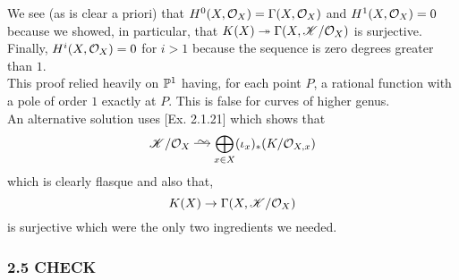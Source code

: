 \documentclass[12pt]{article}
\begin{document}
\begin{center}
\end{center}
We see (as is clear a priori) that $H^0(X, \struct{X}) = \Gamma(X, \struct{X})$ and $H^1(X, \struct{X}) = 0$ because we showed, in particular, that $K(X) \onto \Gamma(X, \K/\struct{X})$ is surjective. Finally, $H^i(X, \struct{X}) = 0$ for $i > 1$ because the sequence is zero degrees greater than $1$.
\bigskip\\
This proof relied heavily on $\P^1$ having, for each point $P$, a rational function with a pole of order $1$ exactly at $P$. This is false for curves of higher genus.
\bigskip\\
An alternative solution uses [Ex. 2.1.21] which shows that
\[ \K /\struct{X} \iso \bigoplus_{x \in X} (\iota_x)_* (K / \stalk{X}{x}) \]
which is clearly flasque and also that,
\[ K(X) \to \Gamma(X, \K/\struct{X}) \]
is surjective which were the only two ingredients we needed.

\subsubsection{2.5 CHECK}
\end{document}
